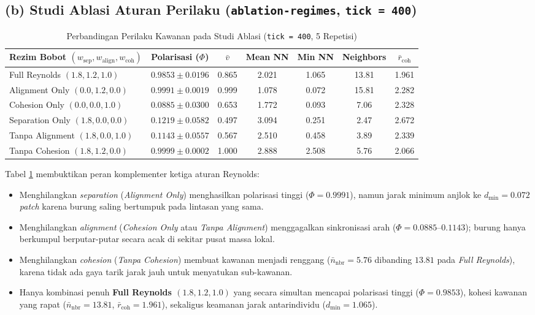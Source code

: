 \documentclass[11pt,a4paper]{article}
\begin{document}
\subsection*{(b) Studi Ablasi Aturan Perilaku (\texttt{ablation-regimes}, \texttt{tick = 400})}
\begin{table}[H]
\centering
\small
\setlength{\tabcolsep}{4.5pt}
\begin{tabular}{lcccccc}
\toprule
\textbf{Rezim Bobot $(w_{\text{sep}}, w_{\text{align}}, w_{\text{coh}})$} & \textbf{Polarisasi ($\Phi$)} & \textbf{$\bar{v}$} & \textbf{Mean NN} & \textbf{Min NN} & \textbf{Neighbors} & \textbf{$\bar{r}_{\text{coh}}$} \\
\midrule
Full Reynolds $(1.8, 1.2, 1.0)$ & $0.9853 \pm 0.0196$ & 0.865 & 2.021 & 1.065 & 13.81 & 1.961 \\
Alignment Only $(0.0, 1.2, 0.0)$ & $0.9991 \pm 0.0019$ & 0.999 & 1.078 & 0.072 & 15.81 & 2.282 \\
Cohesion Only $(0.0, 0.0, 1.0)$ & $0.0885 \pm 0.0300$ & 0.653 & 1.772 & 0.093 & 7.06 & 2.328 \\
Separation Only $(1.8, 0.0, 0.0)$ & $0.1219 \pm 0.0582$ & 0.497 & 3.094 & 0.251 & 2.47 & 2.672 \\
Tanpa Alignment $(1.8, 0.0, 1.0)$ & $0.1143 \pm 0.0557$ & 0.567 & 2.510 & 0.458 & 3.89 & 2.339 \\
Tanpa Cohesion $(1.8, 1.2, 0.0)$ & $0.9999 \pm 0.0002$ & 1.000 & 2.888 & 2.508 & 5.76 & 2.066 \\
\bottomrule
\end{tabular}
\caption{Perbandingan Perilaku Kawanan pada Studi Ablasi (\texttt{tick = 400}, 5 Repetisi)}
\label{tab:ablation}
\end{table}

Tabel \ref{tab:ablation} membuktikan peran komplementer ketiga aturan Reynolds:
\begin{itemize}
    \item Menghilangkan \textit{separation} (\textit{Alignment Only}) menghasilkan polarisasi tinggi ($\Phi = 0.9991$), namun jarak minimum anjlok ke $d_{\min} = 0.072$ \textit{patch} karena burung saling bertumpuk pada lintasan yang sama.
    \item Menghilangkan \textit{alignment} (\textit{Cohesion Only} atau \textit{Tanpa Alignment}) menggagalkan sinkronisasi arah ($\Phi = 0.0885$--$0.1143$); burung hanya berkumpul berputar-putar secara acak di sekitar pusat massa lokal.
    \item Menghilangkan \textit{cohesion} (\textit{Tanpa Cohesion}) membuat kawanan menjadi renggang ($\bar{n}_{\text{nbr}} = 5.76$ dibanding $13.81$ pada \textit{Full Reynolds}), karena tidak ada gaya tarik jarak jauh untuk menyatukan sub-kawanan.
    \item Hanya kombinasi penuh \textbf{Full Reynolds $(1.8, 1.2, 1.0)$} yang secara simultan mencapai polarisasi tinggi ($\Phi = 0.9853$), kohesi kawanan yang rapat ($\bar{n}_{\text{nbr}} = 13.81$, $\bar{r}_{\text{coh}} = 1.961$), sekaligus keamanan jarak antarindividu ($d_{\min} = 1.065$).
\end{itemize}
\end{document}
